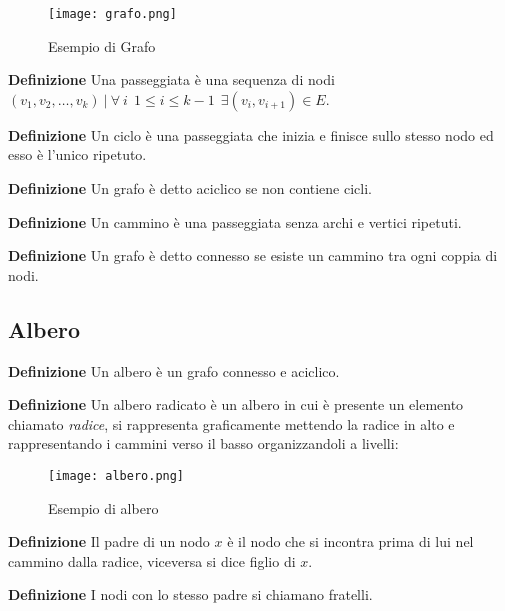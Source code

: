 \documentclass{article}
\begin{document}
\begin{figure}[ht]
    \centering
    \texttt{[image: grafo.png]}
    \caption{Esempio di Grafo}
    \label{fig:grafo}
\end{figure}

\noindent\textbf{Definizione} Una passeggiata è una sequenza di nodi $(v_1,v_2,\ldots,v_k)\ |\ \forall\ i\ \ 1\leq i\leq k-1\ \ \exists(v_i,v_{i+1})\in E $.\newline 

\noindent\textbf{Definizione} Un ciclo è una passeggiata che inizia e finisce sullo stesso nodo ed esso è l'unico ripetuto.\newline

\noindent\textbf{Definizione} Un grafo è detto aciclico se non contiene cicli.\newline

\noindent\textbf{Definizione} Un cammino è una passeggiata senza archi e vertici ripetuti.\newline

\noindent\textbf{Definizione} Un grafo è detto connesso se esiste un cammino tra ogni coppia di nodi.\newline

\newpage

\subsection{Albero}

\textbf{Definizione} Un albero è un grafo connesso e aciclico.\newline

\noindent\textbf{Definizione} Un albero radicato è un albero in cui è presente un elemento chiamato \textit{radice}, si rappresenta graficamente mettendo la radice in alto e rappresentando i cammini verso il basso organizzandoli a livelli:

\begin{figure}[ht]
    \centering
    \texttt{[image: albero.png]}
    \caption{Esempio di albero}
    \label{fig:albero}
\end{figure}

\noindent\textbf{Definizione} Il padre di un nodo $x$ è il nodo che si incontra prima di lui nel cammino dalla radice, viceversa si dice figlio di $x$.\newline

\noindent\textbf{Definizione} I nodi con lo stesso padre si chiamano fratelli.\newline
\end{document}
